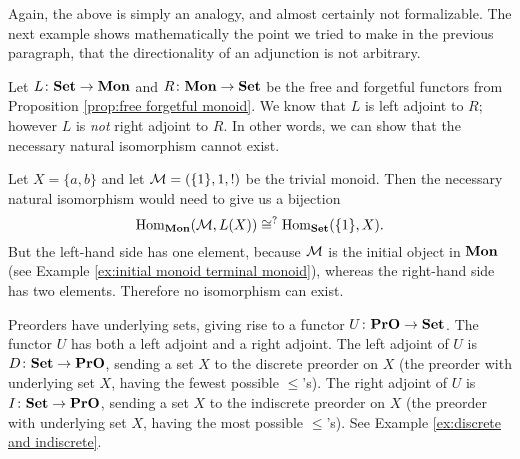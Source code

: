 \documentclass[CT4S-EN-RU]{subfiles}
\begin{document}
\begin{blockRUS}
\end{blockRUS}

\begin{blockENG}
Again, the above is simply an analogy, and almost certainly not formalizable. The next example shows mathematically the point we tried to make in the previous paragraph, that the directionality of an adjunction is not arbitrary.
\end{blockENG}

\begin{blockRUS}
\end{blockRUS}

\begin{exampleENG}\label{ex:adjunction monoids and sets}
Let $L\colon{\bf Set}\rightarrow{\bf Mon}$ and $R\colon{\bf Mon}\rightarrow{\bf Set}$ be the free and forgetful functors from Proposition \ref{prop:free forgetful monoid}. We know that $L$ is left adjoint to $R$; however $L$ is {\em not} right adjoint to $R$. In other words, we can show that the necessary natural isomorphism cannot exist.

Let $X=\{a,b\}$ and let $\mathcal{M}=(\{1\},1,!)$ be the trivial monoid. Then the necessary natural isomorphism would need to give us a bijection 
$$\textnormal{Hom}_{\bf Mon}(\mathcal{M},L(X))\cong^?\textnormal{Hom}_{\bf Set}(\{1\},X).$$ 
But the left-hand side has one element, because $\mathcal{M}$ is the initial object in ${\bf Mon}$ (see Example \ref{ex:initial monoid terminal monoid}), whereas the right-hand side has two elements. Therefore no isomorphism can exist.
\end{exampleENG}

\begin{exampleRUS}\label{ex:adjunction monoids and sets}
\end{exampleRUS}

\begin{exampleENG}
Preorders have underlying sets, giving rise to a functor $U\colon{\bf PrO}\rightarrow{\bf Set}$. The functor $U$ has both a left adjoint and a right adjoint. The left adjoint of $U$ is $D\colon{\bf Set}\rightarrow{\bf PrO}$, sending a set $X$ to the discrete preorder on $X$ (the preorder with underlying set $X$, having the fewest possible $\leq$'s). The right adjoint of $U$ is $I\colon{\bf Set}\rightarrow{\bf PrO}$, sending a set $X$ to the indiscrete preorder on $X$ (the preorder with underlying set $X$, having the most possible $\leq$'s). See Example \ref{ex:discrete and indiscrete}. 
\end{exampleENG}
\end{document}
